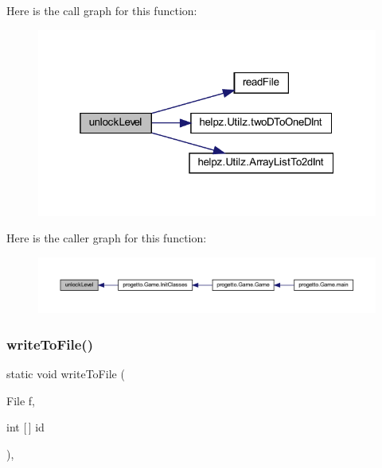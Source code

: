 Here is the call graph for this function\+:
\nopagebreak
\begin{figure}[H]
\begin{center}
\leavevmode
\includegraphics[width=319pt]{classhelpz_1_1_load_save_a1369888f20d8279b649d556082d38e72_cgraph}
\end{center}
\end{figure}
Here is the caller graph for this function\+:\nopagebreak
\begin{figure}[H]
\begin{center}
\leavevmode
\includegraphics[width=350pt]{classhelpz_1_1_load_save_a1369888f20d8279b649d556082d38e72_icgraph}
\end{center}
\end{figure}
\mbox{\label{classhelpz_1_1_load_save_a953963a355bc62c6a3c1fdb51851d796}} 
\subsubsection{\texorpdfstring{write\+To\+File()}{writeToFile()}}
{\footnotesize\ttfamily static void write\+To\+File (\begin{DoxyParamCaption}\item[{File}]{f,  }\item[{int \mbox{[}$\,$\mbox{]}}]{id }\end{DoxyParamCaption})\hspace{0.3cm}{\ttfamily [static]}, {\ttfamily [private]}}



